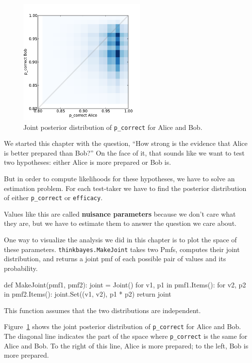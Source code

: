 \documentclass[12pt]{book}
\theoremstyle{exercise}
\begin{document}
\begin{figure}
\centerline{\includegraphics[height=2.5in]{figs/sat_joint.pdf}}
\caption{Joint posterior distribution of {\tt p\_correct} for Alice and Bob.}
\label{fig.satjoint}
\end{figure}

We started this chapter with the question,
``How strong is the evidence that Alice is better prepared
than Bob?''  On the face of it, that sounds like we want to
test two hypotheses: either Alice is more prepared or Bob is.

But in order to compute likelihoods for these hypotheses, we
have to solve an estimation problem.  For each test-taker
we have to find the posterior distribution of either
\verb"p_correct" or \verb"efficacy".

Values like this are called {\bf nuisance parameters} because
we don't care what they are, but we have
to estimate them to answer the question we care about.

One way to visualize the analysis we did in this chapter is
to plot the space of these parameters.  \verb"thinkbayes.MakeJoint"
takes two Pmfs, computes their joint distribution, and returns
a joint pmf of each possible pair of values and its probability.

\begin{code}
def MakeJoint(pmf1, pmf2):
    joint = Joint()
    for v1, p1 in pmf1.Items():
        for v2, p2 in pmf2.Items():
            joint.Set((v1, v2), p1 * p2)
    return joint
\end{code}

This function assumes that the two distributions are independent.

Figure~\ref{fig.satjoint} shows the joint posterior distribution of
\verb"p_correct" for Alice and Bob.  The diagonal line indicates the
part of the space where \verb"p_correct" is the same for Alice and
Bob.  To the right of this line, Alice is more prepared; to the left,
Bob is more prepared.
\end{document}
